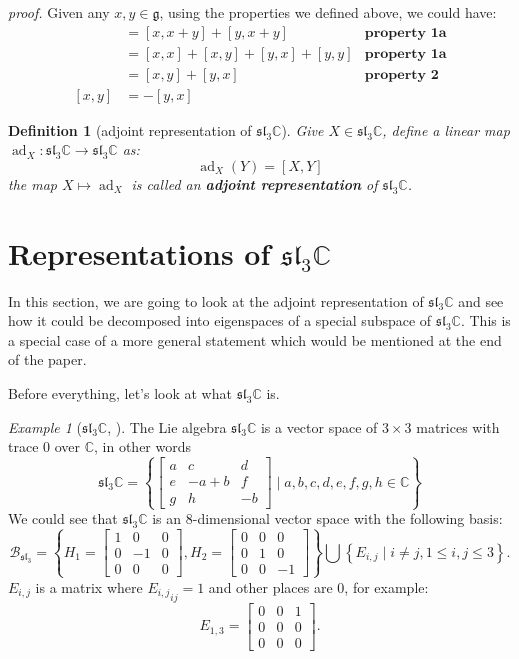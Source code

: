 \documentclass[a4paper]{article}
\newcommand{\C}{\mathbb{C}}
\theoremstyle{bfnote} %
\theoremstyle{bfnote}                  %
\newtheorem{defn}[thm]{Definition}
\theoremstyle{example}                       %
\theoremstyle{remark}                       %
\newtheorem{exmp}[thm]{Example}  %
\numberwithin{equation}{section}
\begin{document}
\textit{proof.}
Given any $x,y \in \mathfrak{g}$, using the properties we defined above, we could have:
\begin{align*}
	[x+y, x+y] &= [x, x+y] + [y, x+y] & \textbf{property 1a} \\
		   &= [x,x] + [x,y] + [y,x] + [y,y] & \textbf{property 1a} \\
		   &= [x,y] + [y,x] & \textbf{property 2} \\
	[x,y] &= -[y,x]
\end{align*}

\begin{defn}[adjoint representation of $\mathfrak{sl}_3\C$]\label{adjoint}
	Give $X \in \mathfrak{sl}_3\C$, define a linear map $\operatorname{ad}_X : \mathfrak{sl}_3\C \to \mathfrak{sl}_3\C$ as: \[
		\operatorname{ad}_X(Y) = [X,Y]
	\] the map $X \mapsto \operatorname{ad}_X$ is called an \textbf{adjoint representation} of $\mathfrak{sl}_3\C$.
\end{defn}

\section{Representations of $\mathfrak{sl}_3\C$}
In this section, we are going to look at the adjoint representation of $\mathfrak{sl}_3\C$ and see how it could be decomposed into eigenspaces of a special subspace of  $\mathfrak{sl}_3\C$. This is a special case of a more general statement which would be mentioned at the end of the paper.

Before everything, let's look at what  $\mathfrak{sl}_3\C$ is.

\bigskip

\begin{exmp}[$\mathfrak{sl}_3\C$, \citep{hall}]
	The Lie algebra $\mathfrak{sl}_3\C$ is a vector space of  $3 \times 3$ matrices with trace  $0$ over  $\C$, in other words \[
		\mathfrak{sl}_{3}\C = \left\{ \begin{bmatrix} a & c & d \\
		e & -a+b & f \\ g & h & -b\end{bmatrix} \mid a,b,c,d,e,f,g,h \in \C \right\} 
	\]
	We could see that $\mathfrak{sl}_3\C$ is an  $8$-dimensional vector space with the following basis: \[
	\mathcal{B}_{\mathfrak{sl}_{3}} = \left\{ H_1 = \begin{bmatrix} 1 & 0 &0 \\ 0 & -1 & 0 \\ 0 &0 &0 \end{bmatrix}, H_2 = \begin{bmatrix} 0 &0 &0 \\ 0 &1&0 \\ 0&0&-1 \end{bmatrix}   \right\} \bigcup \left\{ E_{i,j} \mid i \neq j, 1\le i,j \le 3\right\}. 
\] $E_{i,j}$ is a matrix where ${E_{i,j}}_{ij} = 1$ and other places are $0$, for example:\[
		E_{1,3} = \begin{bmatrix} 0 & 0 & 1 \\ 0 & 0 &0 \\ 0 &0 &0 \end{bmatrix}. 
	\] 
\end{exmp}
\end{document}
